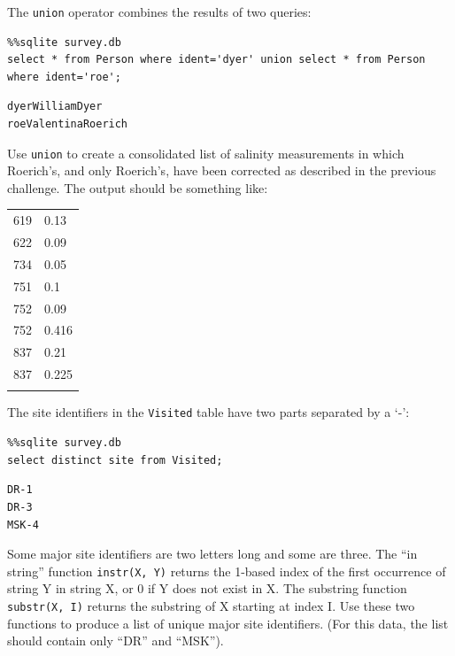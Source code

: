\documentclass{book}
\begin{document}
\begin{challenge}
  The \texttt{union} operator combines the results of two queries:
\begin{verbatim}
%%sqlite survey.db
select * from Person where ident='dyer' union select * from Person where ident='roe';
\end{verbatim}

\begin{verbatim}
dyerWilliamDyer
roeValentinaRoerich
\end{verbatim}

Use \texttt{union} to create a consolidated list of salinity
measurements in which Roerich's, and only Roerich's, have been corrected
as described in the previous challenge. The output should be something
like:

\begin{tabular}{@{}ll@{}}
\hline\noalign{\medskip}
619 & 0.13
\\\noalign{\medskip}
622 & 0.09
\\\noalign{\medskip}
734 & 0.05
\\\noalign{\medskip}
751 & 0.1
\\\noalign{\medskip}
752 & 0.09
\\\noalign{\medskip}
752 & 0.416
\\\noalign{\medskip}
837 & 0.21
\\\noalign{\medskip}
837 & 0.225
\\\noalign{\medskip}
\hline
\end{tabular}
\end{challenge}

\begin{challenge}
  The site identifiers in the \texttt{Visited} table have two parts
  separated by a `-':

\begin{verbatim}
%%sqlite survey.db
select distinct site from Visited;
\end{verbatim}

\begin{verbatim}
DR-1
DR-3
MSK-4
\end{verbatim}

Some major site identifiers are two letters long and some are three. The
``in string'' function \texttt{instr(X, Y)} returns the 1-based index of
the first occurrence of string Y in string X, or 0 if Y does not exist
in X. The substring function \texttt{substr(X, I)} returns the substring
of X starting at index I. Use these two functions to produce a list of
unique major site identifiers. (For this data, the list should contain
only ``DR'' and ``MSK'').
\end{challenge}
\end{document}
